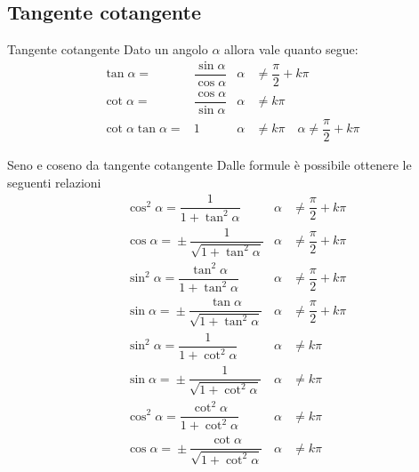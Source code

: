 \subsection{Tangente cotangente}
\label{sec:TangenteCotangente}
\begin{definizionet}{Tangente cotangente}{}
	Dato un angolo $\alpha$ allora vale quanto segue:
\begin{align}
\tan\alpha=&{}\dfrac{\sin\alpha}{\cos\alpha}&\alpha&{}\neq\dfrac{\pi}{2}+k\pi\label{equ:tangente1}\\
\cot\alpha=&{}\dfrac{\cos\alpha}{\sin\alpha}& \alpha&{}\neq k\pi\label{equ:cotangente1}\\
\cot\alpha\tan\alpha=&{}1&\alpha&{}\neq k\pi\quad\alpha{}\neq\dfrac{\pi}{2}+k\pi
\end{align}
\end{definizionet}
\begin{teoremat}{Seno e coseno da tangente cotangente}
Dalle formule\nobs{} è possibile ottenere le seguenti relazioni
\begin{align*}
&\cos^{2}\alpha={}\dfrac{1}{1+{\tan}^{2}\alpha} &\alpha&{}\neq\dfrac{\pi}{2}+k\pi\\
&\cos\alpha={}\pm\dfrac{1}{\sqrt{1+{\tan}^{2}\alpha}} &\alpha{}&\neq\dfrac{\pi}{2}+k\pi\\
&\sin^{2}\alpha={}\dfrac{\tan^{2}\alpha}{1+\tan^{2}\alpha}&\alpha{}&\neq\dfrac{\pi}{2}+k\pi\\
&\sin\alpha={}\pm\dfrac{\tan\alpha}{\sqrt{1+\tan^{2}\alpha}}&\alpha{}&\neq\dfrac{\pi}{2}+k\pi\\
&\sin^{2}\alpha={}\dfrac{1}{1+{\cot}^{2}\alpha} &\alpha{}&\neq k\pi\\
&\sin\alpha={}\pm\dfrac{1}{\sqrt{1+{\cot}^{2}\alpha}} &\alpha{}&\neq k\pi\\
&\cos^{2}\alpha={}\dfrac{\cot^{2}\alpha}{1+\cot^{2}\alpha}&\alpha{}&\neq k\pi\\
&\cos\alpha={}\pm\dfrac{\cot\alpha}{\sqrt{1+\cot^{2}\alpha}}&\alpha{}&\neq k\pi\\
\end{align*}
\end{teoremat}
